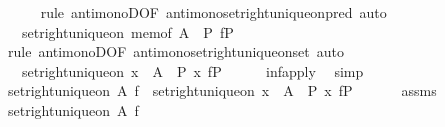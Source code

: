\begin{isabellebody}
\ \ \ \ \isamarkupfalse%
\ {\isacharparenleft}{\kern0pt}rule\ antimonoD{\isacharbrackleft}{\kern0pt}OF\ antimono{\isacharunderscore}{\kern0pt}set{\isacharunderscore}{\kern0pt}right{\isacharunderscore}{\kern0pt}unique{\isacharunderscore}{\kern0pt}on{\isacharunderscore}{\kern0pt}pred{\isacharbrackright}{\kern0pt}{\isacharparenright}{\kern0pt}\ auto\isanewline
\ \ \isamarkupfalse%
\ \isamarkupfalse%
\ {\isachardoublequoteopen}{\isachardot}{\kern0pt}{\isachardot}{\kern0pt}{\isachardot}{\kern0pt}\ {\isasymle}\ set{\isacharunderscore}{\kern0pt}right{\isacharunderscore}{\kern0pt}unique{\isacharunderscore}{\kern0pt}on\ {\isacharparenleft}{\kern0pt}mem{\isacharunderscore}{\kern0pt}of\ A\ {\isasymsqinter}\ P{\isacharparenright}{\kern0pt}\ f{\isasymrestriction}\isactrlbsub P\isactrlesub {\isachardoublequoteclose}\isanewline
\ \ \ \ \isamarkupfalse%
\ {\isacharparenleft}{\kern0pt}rule\ antimonoD{\isacharbrackleft}{\kern0pt}OF\ antimono{\isacharunderscore}{\kern0pt}set{\isacharunderscore}{\kern0pt}right{\isacharunderscore}{\kern0pt}unique{\isacharunderscore}{\kern0pt}on{\isacharunderscore}{\kern0pt}set{\isacharbrackright}{\kern0pt}{\isacharparenright}{\kern0pt}\ auto\isanewline
\ \ \isamarkupfalse%
\ \isamarkupfalse%
\ {\isachardoublequoteopen}{\isachardot}{\kern0pt}{\isachardot}{\kern0pt}{\isachardot}{\kern0pt}\ {\isacharequal}{\kern0pt}\ set{\isacharunderscore}{\kern0pt}right{\isacharunderscore}{\kern0pt}unique{\isacharunderscore}{\kern0pt}on\ {\isacharbraceleft}{\kern0pt}x\ {\isasymin}\ A\ {\isacharbar}{\kern0pt}\ P\ x{\isacharbraceright}{\kern0pt}\ f{\isasymrestriction}\isactrlbsub P\isactrlesub {\isachardoublequoteclose}\isanewline
\ \ \ \ \isamarkupfalse%
\ inf{\isacharunderscore}{\kern0pt}apply\ \isamarkupfalse%
\ simp\isanewline
\ \ \isamarkupfalse%
\ \isamarkupfalse%
\ {\isachardoublequoteopen}set{\isacharunderscore}{\kern0pt}right{\isacharunderscore}{\kern0pt}unique{\isacharunderscore}{\kern0pt}on\ A\ f\ {\isasymle}\ set{\isacharunderscore}{\kern0pt}right{\isacharunderscore}{\kern0pt}unique{\isacharunderscore}{\kern0pt}on\ {\isacharbraceleft}{\kern0pt}x\ {\isasymin}\ A\ {\isacharbar}{\kern0pt}\ P\ x{\isacharbraceright}{\kern0pt}\ f{\isasymrestriction}\isactrlbsub P\isactrlesub {\isachardoublequoteclose}\ \isacommand{{\isachardot}{\kern0pt}}\isamarkupfalse%
\isanewline
\ \ \isamarkupfalse%
\ \isamarkupfalse%
\ assms\ \isamarkupfalse%
\ {\isachardoublequoteopen}set{\isacharunderscore}{\kern0pt}right{\isacharunderscore}{\kern0pt}unique{\isacharunderscore}{\kern0pt}on\ A\ f{\isachardoublequoteclose}\ \isamarkupfalse%

\end{isabellebody}
